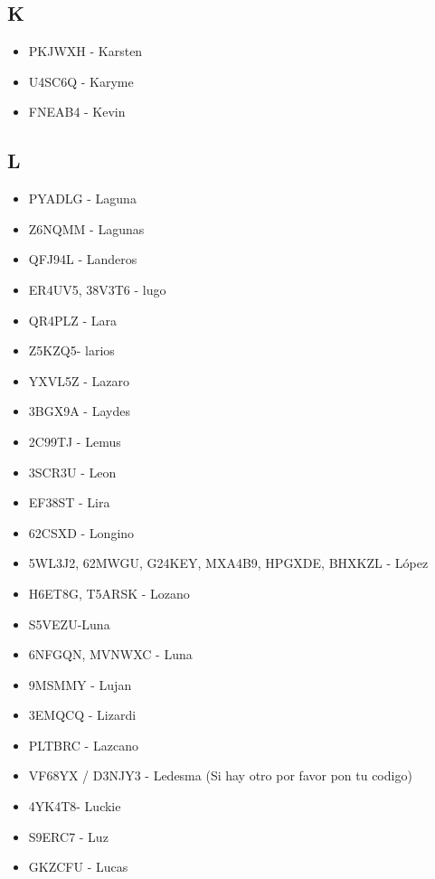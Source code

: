 \subsection*{K}
\begin{itemize}[leftmargin=*,nosep]
\item PKJWXH  -  Karsten
\item U4SC6Q  -  Karyme
\item FNEAB4 - Kevin
\end{itemize}

\subsection*{L}
\begin{itemize}[leftmargin=*,nosep]
\item PYADLG - Laguna
\item Z6NQMM - Lagunas
\item QFJ94L - Landeros
\item ER4UV5, 38V3T6 - lugo
\item QR4PLZ  -  Lara
\item Z5KZQ5- larios
\item YXVL5Z  -  Lazaro
\item 3BGX9A - Laydes
\item 2C99TJ  -  Lemus
\item 3SCR3U - Leon
\item EF38ST - Lira
\item 62CSXD  -  Longino
\item 5WL3J2, 62MWGU, G24KEY, MXA4B9, HPGXDE, BHXKZL -  López
\item H6ET8G, T5ARSK  -  Lozano
\item S5VEZU-Luna
\item 6NFGQN, MVNWXC - Luna
\item 9MSMMY - Lujan
\item 3EMQCQ - Lizardi
\item PLTBRC  - Lazcano
\item VF68YX / D3NJY3 - Ledesma (Si hay otro por favor pon tu codigo)
\item 4YK4T8- Luckie 
\item S9ERC7 - Luz
\item GKZCFU - Lucas
\end{itemize}

